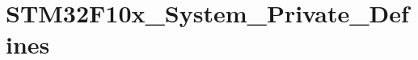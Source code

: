 \hypertarget{group___s_t_m32_f10x___system___private___defines}{\section{S\-T\-M32\-F10x\-\_\-\-System\-\_\-\-Private\-\_\-\-Defines}
\label{group___s_t_m32_f10x___system___private___defines}
}
